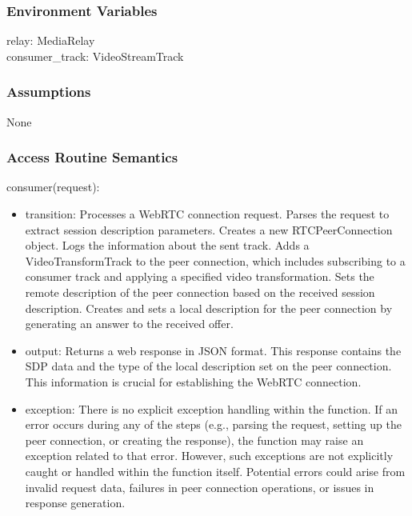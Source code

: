 \documentclass[12pt, titlepage]{article}
\begin{document}
\subsubsection{Environment Variables}
relay: MediaRelay\\
consumer\_track: VideoStreamTrack

\subsubsection{Assumptions}
None

\subsubsection{Access Routine Semantics}

\noindent consumer(request):
\begin{itemize}
  \item transition: Processes a WebRTC connection request. Parses the request to extract session description parameters. Creates a new RTCPeerConnection object. Logs the information about the sent track. Adds a VideoTransformTrack to the peer connection, which includes subscribing to a consumer track and applying a specified video transformation. Sets the remote description of the peer connection based on the received session description. Creates and sets a local description for the peer connection by generating an answer to the received offer.
  \item output: Returns a web response in JSON format. This response contains the SDP data and the type of the local description set on the peer connection. This information is crucial for establishing the WebRTC connection.
  \item exception: There is no explicit exception handling within the function. If an error occurs during any of the steps (e.g., parsing the request, setting up the peer connection, or creating the response), the function may raise an exception related to that error. However, such exceptions are not explicitly caught or handled within the function itself. Potential errors could arise from invalid request data, failures in peer connection operations, or issues in response generation.
\end{itemize}
\end{document}
